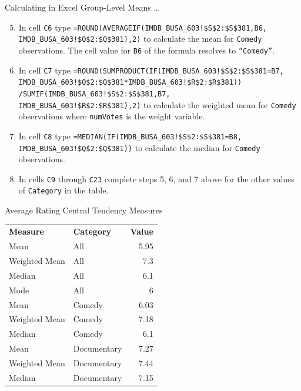 \documentclass[pdf]{beamer}
\theoremstyle{remark}
\theoremstyle{definition}
\begin{document}
\begin{frame}[t]{Calculating in Excel Group-Level Means \ldots}
\small
\begin{enumerate}
\setcounter{enumi}{4}
\item In cell \texttt{C6} type \texttt{=ROUND(AVERAGEIF(IMDB\_BUSA\_603!\$S\$2:\$S\$381,B6, \\ IMDB\_BUSA\_603!\$Q\$2:\$Q\$381),2)} to calculate the mean for \texttt{Comedy} observations. The cell value for \texttt{B6} of the formula resolves to \texttt{``Comedy''}.
\item In cell \texttt{C7} type \texttt{=ROUND(SUMPRODUCT(IF(IMDB\_BUSA\_603!\$S\$2:\$S\$381=B7, \\ IMDB\_BUSA\_603!\$Q\$2:\$Q\$381*IMDB\_BUSA\_603!\$R\$2:\$R\$381)) \\ /SUMIF(IMDB\_BUSA\_603!\$S\$2:\$S\$381,B7, \\ IMDB\_BUSA\_603!\$R\$2:\$R\$381),2)} to calculate the weighted mean for \texttt{Comedy} observations where \texttt{numVotes} is the weight variable.  
\item In cell \texttt{C8} type \texttt{=MEDIAN(IF(IMDB\_BUSA\_603!\$S\$2:\$S\$381=B8, \\ IMDB\_BUSA\_603!\$Q\$2:\$Q\$381))} to calculate the median for \texttt{Comedy} observations.
\item In cells \texttt{C9} through \texttt{C23} complete steps 5, 6, and 7 above for the other values of \texttt{Category} in the table. 
\end{enumerate}
\end{frame}

\begin{frame}[t]{Average Rating Central Tendency Measures}
\begin{table}[htbp]
  \centering
    \captionsetup{justification=centering}
    \begin{tabular}{llr}
    \rowcolor[rgb]{ .851,  .882,  .949} \textbf{Measure} & \textbf{Category} & \multicolumn{1}{l}{\textbf{Value}} \\
    Mean  & All   & 5.95 \\
    Weighted Mean & All   & 7.3 \\
    Median & All   & 6.1 \\
    Mode  & All   & 6 \\
    Mean  & Comedy & 6.03 \\
    Weighted Mean & Comedy & 7.18 \\
    Median & Comedy & 6.1 \\
    Mean  & Documentary & 7.27 \\
    Weighted Mean & Documentary & 7.44 \\
    Median & Documentary & 7.15 \\
    \end{tabular}%
  \label{tab:arctm1}%
\end{table}%
\end{frame}
\end{document}
